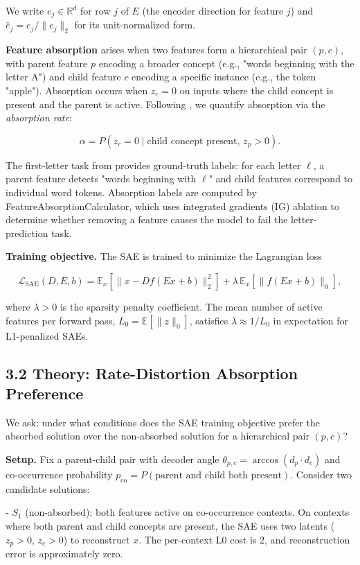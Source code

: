 \documentclass{article}
\begin{document}
We write $e_j \in \mathbb{R}^d$ for row $j$ of $E$ (the encoder direction for feature $j$)
and $\hat{e}_j = e_j / \|e_j\|_2$ for its unit-normalized form.

\textbf{Feature absorption} arises when two features form a hierarchical pair $(p, c)$, with
parent feature $p$ encoding a broader concept (e.g., "words beginning with the letter A")
and child feature $c$ encoding a specific instance (e.g., the token "apple"). Absorption
occurs when $z_c = 0$ on inputs where the child concept is present and the parent is active.
Following \citet{chanin2024absorption}, we quantify absorption via the \emph{absorption rate}:

$$\alpha = P(z_c = 0 \mid \text{child concept present, } z_p > 0).$$

The first-letter task from \citealt{chanin2024absorption} provides ground-truth labels:
for each letter $\ell$, a parent feature detects "words beginning with $\ell$" and child
features correspond to individual word tokens. Absorption labels are computed by
FeatureAbsorptionCalculator, which uses integrated gradients (IG) ablation to determine
whether removing a feature causes the model to fail the letter-prediction task.

\textbf{Training objective.} The SAE is trained to minimize the Lagrangian loss

$$\mathcal{L}_\text{SAE}(D, E, b) = \mathbb{E}_{x}\!\left[\|x - Df(Ex + b)\|_2^2\right]
+ \lambda\, \mathbb{E}_{x}\!\left[\|f(Ex + b)\|_0\right],$$

where $\lambda > 0$ is the sparsity penalty coefficient. The mean number of active features
per forward pass, $L_0 = \mathbb{E}[\|z\|_0]$, satisfies $\lambda \approx 1/L_0$ in
expectation for L1-penalized SAEs.


\subsection{3.2 Theory: Rate-Distortion Absorption Preference}

We ask: under what conditions does the SAE training objective prefer the absorbed solution
over the non-absorbed solution for a hierarchical pair $(p, c)$?

\textbf{Setup.} Fix a parent-child pair with decoder angle $\theta_{p,c} = \arccos(d_p \cdot
d_c)$ and co-occurrence probability $p_\text{co} = P(\text{parent and child both present})$.
Consider two candidate solutions:

- $S_1$ (non-absorbed): both features active on co-occurrence contexts. On contexts where
  both parent and child concepts are present, the SAE uses two latents ($z_p > 0$,
  $z_c > 0$) to reconstruct $x$. The per-context L0 cost is 2, and reconstruction error is
  approximately zero.
\end{document}
